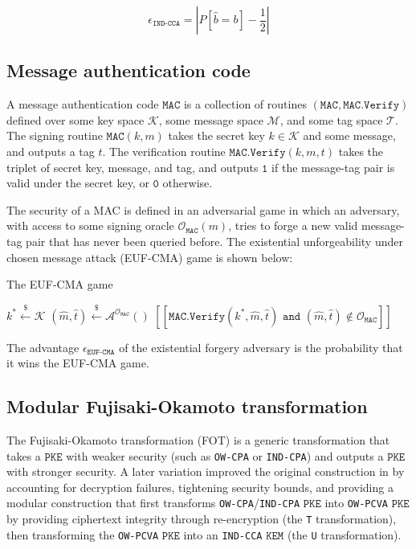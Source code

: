 \documentclass[floatrow,journal=tches,submission]{iacrtrans}
\newcommand{\monospace}{\texttt}
\newcommand{\pke}{\monospace{PKE}}
\newcommand{\kem}{\monospace{KEM}}
\newcommand{\mac}{\monospace{MAC}}
\newcommand{\sign}{\monospace{MAC}}
\newcommand{\verify}{\monospace{MAC.Verify}}
\newcommand{\leftsample}{\stackrel{\$}{\leftarrow}}
\newcommand{\llbrack}{[\![}
\newcommand{\rrbrack}{]\!]}
\newcommand{\norm}[1]{\left\lvert #1 \right\rvert}
\begin{document}
\begin{equation*}
    \epsilon_\monospace{IND-CCA} = \norm{
        P[\hat{b} = b] - \frac{1}{2}
    }
\end{equation*}

\subsection{Message authentication code}
A message authentication code $\mac$ is a collection of routines $(\sign, \verify)$ defined over some key space $\mathcal{K}$, some message space $\mathcal{M}$, and some tag space $\mathcal{T}$. The signing routine $\sign(k, m)$ takes the secret key $k \in \mathcal{K}$ and some message, and outputs a tag $t$. The verification routine $\verify(k, m, t)$ takes the triplet of secret key, message, and tag, and outputs $\monospace{1}$ if the message-tag pair is valid under the secret key, or $\monospace{0}$ otherwise.

The security of a MAC is defined in an adversarial game in which an adversary, with access to some signing oracle $\mathcal{O}_\sign(m)$, tries to forge a new valid message-tag pair that has never been queried before. The existential unforgeability under chosen message attack (EUF-CMA) game is shown below:

\begin{algorithm}
    \caption{The EUF-CMA game}\label{alg:mac-euf-cma-game}

    \begin{algorithmic}[1]
        \State $k^\ast \leftsample \mathcal{K}$
        \State $(\hat{m}, \hat{t}) \leftsample \mathcal{A}^{\mathcal{O}_\sign}()$
        \State \Return $
            \llbrack \verify(k^\ast, \hat{m}, \hat{t}) 
            \monospace{ and } (\hat{m}, \hat{t}) \not\in \mathcal{O}_\sign
            \rrbrack
        $
    \end{algorithmic}
\end{algorithm}

The advantage $\epsilon_\monospace{EUF-CMA}$ of the existential forgery adversary is the probability that it wins the EUF-CMA game.

\subsection{Modular Fujisaki-Okamoto transformation}
The Fujisaki-Okamoto transformation (FOT) \cite{fujisaki1999secure} is a generic transformation that takes a $\pke$ with weaker security (such as \monospace{OW-CPA} or \monospace{IND-CPA}) and outputs a $\pke$ with stronger security. A later variation \cite{hofheinz2017modular} improved the original construction in \cite{fujisaki1999secure} by accounting for decryption failures, tightening security bounds, and providing a modular construction that first transforms \monospace{OW-CPA}/\monospace{IND-CPA} $\pke$ into \monospace{OW-PCVA} $\pke$ by providing ciphertext integrity through re-encryption (the \monospace{T} transformation), then transforming the \monospace{OW-PCVA} $\pke$ into an \monospace{IND-CCA} $\kem$ (the \monospace{U} transformation).
\end{document}
